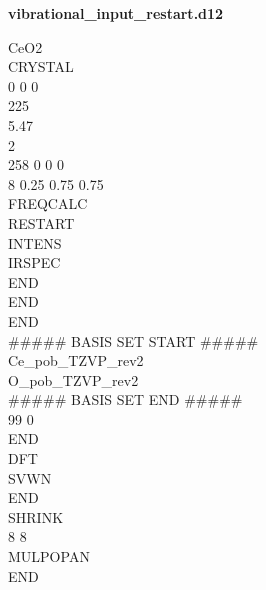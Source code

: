 \documentclass{article}
\begin{document}
\begin{minipage}[t]{0.45\textwidth}
    \textbf{vibrational\_input\_restart.d12}
    
    \vspace{15pt}
    
    CeO2
	\\CRYSTAL
	\\0 0 0 
	\\225
	\\5.47
	\\2
	\\258 0 0 0
	\\8 0.25 0.75 0.75
	\\FREQCALC
	\\RESTART
	\\INTENS
	\\IRSPEC
	\\END
	\\END
	\\END
	\\\#\#\#\#\# BASIS SET START \#\#\#\#\#
	\\Ce\_pob\_TZVP\_rev2
	\\O\_pob\_TZVP\_rev2
	\\\#\#\#\#\# BASIS SET END \#\#\#\#\#
	\\99 0
	\\END
	\\DFT
	\\SVWN
	\\END
	\\SHRINK
	\\8 8
	\\MULPOPAN
	\\END


\end{minipage}

\newpage

  
\end{document}
